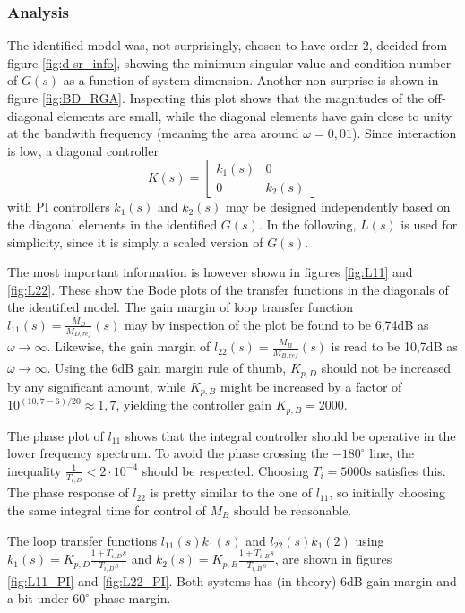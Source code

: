 \documentclass[12pt]{article}
\begin{document}
\subsubsection{Analysis}
The identified model was, not surprisingly, chosen to have order 2, decided from figure \ref{fig:d-sr_info}, showing the minimum singular value and condition number of $G(s)$ as a function of system dimension. Another non-surprise is shown in figure \ref{fig:BD_RGA}. Inspecting this plot shows that the magnitudes of the off-diagonal elements are small, while the diagonal elements have gain close to unity at the bandwith frequency (meaning the area around $\omega = 0,01$). Since interaction is low, a diagonal controller
\begin{equation}
K(s) =
\begin{bmatrix}
k_1(s) & 0\\
0 & k_2(s)
\end{bmatrix}
\end{equation}
with PI controllers $k_1(s)$ and $k_2(s)$ may be designed independently based on the diagonal elements in the identified $G(s)$. In the following, $L(s)$ is used for simplicity, since it is simply a scaled version of $G(s)$.

The most important information is however shown in figures \ref{fig:L11} and \ref{fig:L22}. These show the Bode plots of the transfer functions in the diagonals of the identified model. The gain margin of loop transfer function $l_{11}(s) = \frac{M_D}{M_{D, ref}}(s)$ may by inspection of the plot be found to be 6,74dB as $\omega \rightarrow \infty$. Likewise, the gain margin of $l_{22}(s) = \frac{M_B}{M_{B, ref}}(s)$ is read to be 10,7dB as $\omega \rightarrow \infty$. Using the 6dB gain margin rule of thumb, $K_{p, D}$ should not be increased by any significant amount, while $K_{p, B}$ might be increased by a factor of $10^{(10,7-6)/20} \approx 1,7$, yielding the controller gain $K_{p, B} = 2000$.

The phase plot of $l_{11}$ shows that the integral controller should be operative in the lower frequency spectrum. To avoid the phase crossing the $-180^\circ$ line, the inequality $\frac{1}{T_{i, D}} < 2 \cdot 10^{-4}$ should be respected. Choosing $T_i = 5000s$ satisfies this. The phase response of $l_{22}$ is pretty similar to the one of $l_{11}$, so initially choosing the same integral time for control of $M_B$ should be reasonable.

The loop transfer functions $l_{11}(s) k_1(s)$ and $l_{22}(s) k_1(2)$ using $k_1(s) = K_{p, D}\frac{1 + T_{i, D} s}{T_{i, D} s}$ and $k_2(s) = K_{p, B}\frac{1 + T_{i, B} s}{T_{i, B} s}$, are shown in figures \ref{fig:L11_PI} and \ref{fig:L22_PI}. Both systems has (in theory) 6dB gain margin and a bit under $60^\circ$ phase margin.
\end{document}
